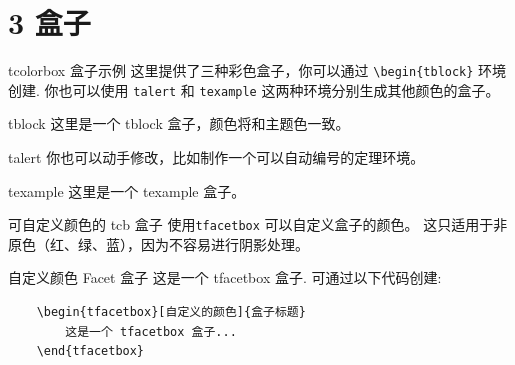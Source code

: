 \documentclass[10pt,aspectratio=169,fontset=none]{ctexbeamer}
\begin{document}
    \section{3 盒子}

    \begin{frame}{tcolorbox 盒子示例}
        这里提供了三种彩色盒子，你可以通过 \texttt{\textcolor{primary}{\textbackslash begin}\{tblock\}} 环境创建. 你也可以使用 \texttt{talert} 和 \texttt{texample} 这两种环境分别生成其他颜色的盒子。
        \begin{tblock}{tblock}
            这里是一个 tblock 盒子，颜色将和主题色一致。
        \end{tblock}
        \begin{talert}{talert}
            你也可以动手修改，比如制作一个可以自动编号的定理环境。
        \end{talert}
        \begin{texample}{texample}
            这里是一个 texample 盒子。
        \end{texample}
    \end{frame}

    \begin{frame}[fragile]{可自定义颜色的 tcb 盒子 }
        使用\texttt{tfacetbox} 可以自定义盒子的颜色。 这只适用于非原色（红、绿、蓝），因为不容易进行阴影处理。
        \begin{tfacetbox}[nudarkyellow]{自定义颜色 Facet 盒子}
            这是一个 tfacetbox 盒子. 可通过以下代码创建:
            \begin{verbatim}
    \begin{tfacetbox}[自定义的颜色]{盒子标题}
        这是一个 tfacetbox 盒子...
    \end{tfacetbox}
            \end{verbatim}
        \end{tfacetbox}
    \end{frame}
\end{document}
